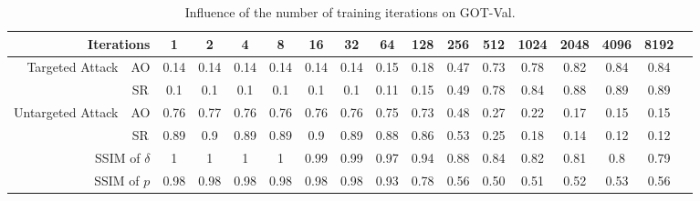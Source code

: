 \documentclass[journal]{IEEEtran}
\begin{document}
\begin{table}
  \centering
  \caption{Influence of the number of training iterations on GOT-Val.}
  \begin{tabular}{rcccccccccccccccc} 
  \toprule
  \multicolumn{2}{r}{Iterations}     & 1     & 2     & 4     & 8     & 16    & 32    & 64    & 128   & 256   & 512   & 1024  & 2048  & 4096  & 8192  \\ 
  \midrule
  \multirow{2}{*}{Targeted Attack} & AO    &  0.14 & 0.14 & 0.14 & 0.14 & 0.14 & 0.14 & 0.15 & 0.18 & 0.47 & 0.73 & 0.78 & 0.82 & 0.84 & 0.84  \\
                              & SR    &  0.1 & 0.1 & 0.1 & 0.1 & 0.1 & 0.1 & 0.11 & 0.15 & 0.49 & 0.78 & 0.84 & 0.88 & 0.89 & 0.89    \\ 
  \midrule
  \multirow{2}{*}{Untargeted Attack} & AO   & 0.76 & 0.77 & 0.76 & 0.76 & 0.76 & 0.76 & 0.75 & 0.73 & 0.48 & 0.27 & 0.22 & 0.17 & 0.15 & 0.15    \\
                              & SR   & 0.89 & 0.9 & 0.89 & 0.89 & 0.9 & 0.89 & 0.88 & 0.86 & 0.53 & 0.25 & 0.18 & 0.14 & 0.12 & 0.12    \\ 
  \midrule
  \multicolumn{2}{r}{SSIM of $\delta$}&   1 & 1 & 1 & 1 & 0.99 & 0.99 & 0.97 & 0.94 & 0.88 & 0.84 & 0.82 & 0.81 & 0.8 & 0.79\\
  \midrule
  \multicolumn{2}{r}{SSIM of $p$}      &  0.98 & 0.98 & 0.98 & 0.98 & 0.98 & 0.98 & 0.93 & 0.78 & 0.56 & 0.50 & 0.51 & 0.52 & 0.53 & 0.56\\
  \bottomrule
  \end{tabular}
  \label{tab:iter}
  \vspace{-3mm}
\end{table}
\end{document}
